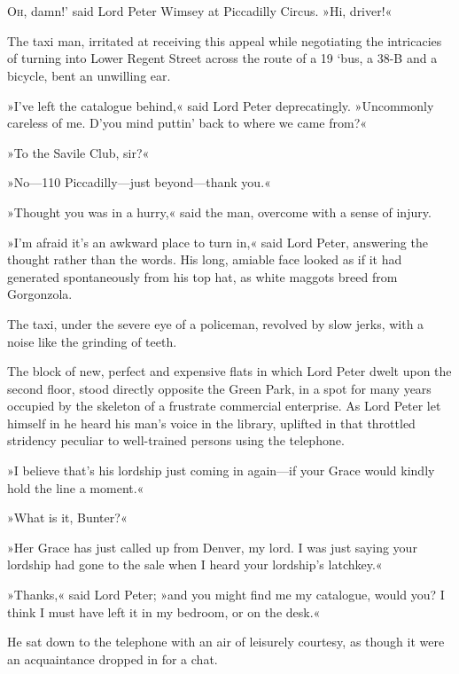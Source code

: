 \chapter[Chapter \thechapter]{}
\lettrine[lines=4,ante=‘]{O}{h}, damn!' said Lord Peter Wimsey at Piccadilly Circus. »Hi, driver!«

\zz
The taxi man, irritated at receiving this appeal while negotiating the intricacies of turning into Lower Regent Street across the route of a 19 `bus, a 38-B and a bicycle, bent an unwilling ear.

»I've left the catalogue behind,« said Lord Peter deprecatingly. »Uncommonly careless of me. D'you mind puttin' back to where we came from?«

»To the Savile Club, sir?«

»No—110 Piccadilly—just beyond—thank you.«

»Thought you was in a hurry,« said the man, overcome with a sense of injury.

»I'm afraid it's an awkward place to turn in,« said Lord Peter, answering the thought rather than the words. His long, amiable face looked as if it had generated spontaneously from his top hat, as white maggots breed from Gorgonzola.

The taxi, under the severe eye of a policeman, revolved by slow jerks, with a noise like the grinding of teeth.

The block of new, perfect and expensive flats in which Lord Peter dwelt upon the second floor, stood directly opposite the Green Park, in a spot for many years occupied by the skeleton of a frustrate commercial enterprise. As Lord Peter let himself in he heard his man's voice in the library, uplifted in that throttled stridency peculiar to well-trained persons using the telephone.

»I believe that's his lordship just coming in again—if your Grace would kindly hold the line a moment.«

»What is it, Bunter?«

»Her Grace has just called up from Denver, my lord. I was just saying your lordship had gone to the sale when I heard your lordship's latchkey.«

»Thanks,« said Lord Peter; »and you might find me my catalogue, would you? I think I must have left it in my bedroom, or on the desk.«

He sat down to the telephone with an air of leisurely courtesy, as though it were an acquaintance dropped in for a chat.

